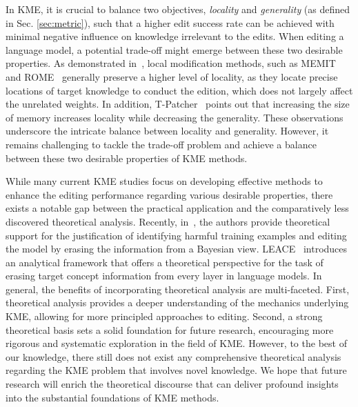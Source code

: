 \documentclass[acmsmall, screen]{acmart}
\begin{document}
In KME, it is crucial to balance two objectives, \textit{locality} and \textit{generality} (as defined in Sec. \ref{sec:metric}), such that a higher edit success rate can be achieved with minimal negative influence on knowledge irrelevant to the edits. When editing a language model, a potential trade-off might emerge between these two desirable properties. As demonstrated in~\cite{yao2023editing}, local modification methods, such as MEMIT~\cite{meng2023mass} and ROME~\cite{meng2022locating} generally preserve a higher level of locality, as they locate precise locations of target knowledge to conduct the edition, which does not largely affect the unrelated weights. In addition, T-Patcher~\cite{Transformer-Patcher} points out that increasing the size of memory increases locality while decreasing the generality. These observations underscore the intricate balance between locality and generality. However, it remains challenging to tackle the trade-off problem and achieve a balance between these two desirable properties of KME methods.

While many current KME studies focus on developing effective methods to enhance the editing performance regarding various desirable properties, there exists a notable gap between the practical application and the comparatively less discovered theoretical analysis. Recently, in~\cite{tanno2022repairing}, the authors provide theoretical support for the justification of identifying harmful training examples and editing the model by erasing the information from a Bayesian view.
LEACE~\cite{belrose2023leace} introduces an analytical framework that offers a theoretical perspective for the task of erasing target concept information from every layer in language models. In general, the benefits of incorporating theoretical analysis are multi-faceted. First, theoretical analysis provides a deeper understanding of the mechanics underlying KME, allowing for more principled approaches to editing. Second, a strong theoretical basis sets a solid foundation for future research, encouraging more rigorous and systematic exploration in the field of KME.
 However, to the best of our knowledge, there still does not exist any comprehensive theoretical analysis regarding the KME problem that involves novel knowledge. 
We hope that future research will enrich the theoretical discourse that can deliver profound insights into the substantial foundations of KME methods.
\end{document}
